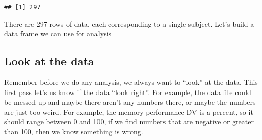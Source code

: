 \documentclass[
]{book}
\newenvironment{Shaded}{\begin{snugshade}}{\end{snugshade}}
\newcommand{\AttributeTok}[1]{\textcolor[rgb]{0.13,0.29,0.53}{#1}}
\newcommand{\DecValTok}[1]{\textcolor[rgb]{0.00,0.00,0.81}{#1}}
\newcommand{\FunctionTok}[1]{\textcolor[rgb]{0.13,0.29,0.53}{\textbf{#1}}}
\newcommand{\NormalTok}[1]{#1}
\newcommand{\OtherTok}[1]{\textcolor[rgb]{0.56,0.35,0.01}{#1}}
\newcommand{\SpecialCharTok}[1]{\textcolor[rgb]{0.81,0.36,0.00}{\textbf{#1}}}
\newcommand{\StringTok}[1]{\textcolor[rgb]{0.31,0.60,0.02}{#1}}
\begin{document}
\begin{Shaded}
\end{Shaded}

\begin{verbatim}
## [1] 297
\end{verbatim}

There are 297 rows of data, each corresponding to a single subject. Let's build a data frame we can use for analysis

\begin{Shaded}
\end{Shaded}

\hypertarget{look-at-the-data-5}{%
\subsection{Look at the data}\label{look-at-the-data-5}}

Remember before we do any analysis, we always want to ``look'' at the data. This first pass let's us know if the data ``look right''. For example, the data file could be messed up and maybe there aren't any numbers there, or maybe the numbers are just too weird. For example, the memory performance DV is a percent, so it should range between 0 and 100, if we find numbers that are negative or greater than 100, then we know something is wrong.
\end{document}
